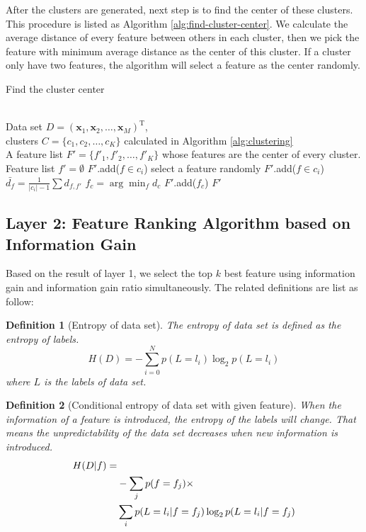 \documentclass[journal]{IEEEtran}
\newtheorem{definition}{Definition}
\begin{document}
After the clusters are generated, next step is to find the center of these clusters. This procedure is listed as Algorithm \ref{alg:find-cluster-center}. We calculate the average distance of every feature between others in each cluster, then we pick the feature with minimum average distance as the center of this cluster. If a cluster only have two features, the algorithm will select a feature as the center randomly.

\begin{algorithm}
\caption{Find the cluster center}
\label{alg:find-cluster-center}
\begin{algorithmic}[1]
\REQUIRE ~~\\
    Data set $D=(\bm{x}_1,\bm{x}_2,\ldots,\bm{x}_M)^\text{T}$, \\
    clusters $C=\{c_1, c_2, \ldots, c_K\}$ calculated in Algorithm \ref{alg:clustering}
\ENSURE ~~\\
    A feature list $F'=\{f'_1, f'_2, \ldots, f'_K\}$ whose features are the center of every cluster. 
\STATE Feature list $f'=\emptyset$
        \STATE $F'$.add($f \in c_i$)
            \STATE select a feature randomly
            \STATE $F'$.add($f \in c_i$)
    \ELSE
            \STATE $\bar{d_f}=\frac{1}{|c_i|-1}\sum d_{f, f'}$
        \ENDFOR
        \STATE $f_c=\arg\min_f d_c$
        \STATE $F'$.add($f_c$)
    \ENDIF
\ENDFOR
\RETURN $F'$
\end{algorithmic}
\end{algorithm}

\subsection{Layer 2: Feature Ranking Algorithm based on Information Gain}

Based on the result of layer 1, we select the top $k$ best feature using information gain and information gain ratio simultaneously. The related definitions are list as follow:

\begin{definition}[Entropy of data set]
The entropy of data set is defined as the entropy of  labels. 
\begin{equation}
    H(D) = -\sum_{i=0}^N p(L=l_i) \log_2 p(L=l_i)
\end{equation}
where $L$ is the labels of data set.
\end{definition}

\begin{definition}[Conditional entropy of data set with given feature]
When the information of a feature is introduced, the entropy of the labels will change. That means the unpredictability of the data set decreases when new information is introduced. 
\begin{align}
     H(D|f)= & \notag \\
    & -\sum_{j} p(f=f_j) \times \notag \\
    & \sum_{i} p(L=l_i|f=f_j) \log_2 p(L=l_i|f=f_j)   
\end{align}
\end{definition}
\end{document}
